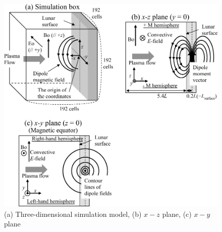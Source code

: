 \documentclass[draft,jgrga]{agutex2015}
\begin{document}
\begin{article}
\begin{figure}[t]
 \centering
 \noindent\includegraphics[]{./figures/Fig_1_bb-crop.pdf}
 \caption{(a) Three-dimensional simulation model, (b) $x-z$ plane, (c) $x-y$ plane}\label{fig:1}
\end{figure}


\end{article}
\end{document}
